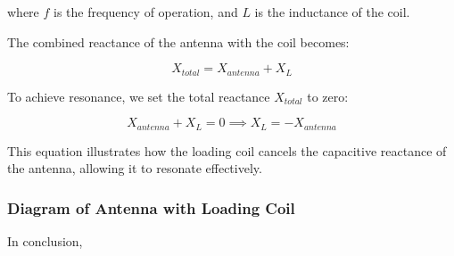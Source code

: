 where \( f \) is the frequency of operation, and \( L \) is the inductance of the coil.

The combined reactance of the antenna with the coil becomes:

\[
X_{total} = X_{antenna} + X_L
\]

To achieve resonance, we set the total reactance \( X_{total} \) to zero:

\[
X_{antenna} + X_L = 0 \implies X_L = -X_{antenna}
\]

This equation illustrates how the loading coil cancels the capacitive reactance of the antenna, allowing it to resonate effectively.

\subsubsection{Diagram of Antenna with Loading Coil}
\begin{center}
\end{center}

In conclusion, 
